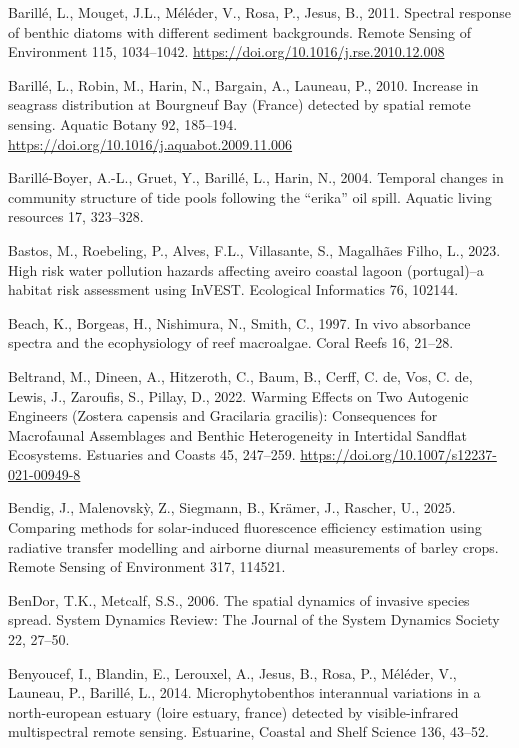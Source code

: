 \documentclass[
  letterpaper,
  11pt,
  english,
  singlespacing,
  headsepline]{MastersDoctoralThesis}
\newlength{\cslhangindent}
\newenvironment{CSLReferences}[2] %
 {\begin{list}{}{%
  \setlength{\itemindent}{0pt}
  \setlength{\leftmargin}{0pt}
  \setlength{\parsep}{0pt}
  \ifodd #1
   \setlength{\leftmargin}{\cslhangindent}
   \setlength{\itemindent}{-1\cslhangindent}
  \fi
  \setlength{\itemsep}{#2\baselineskip}}}
 {\end{list}}
\begin{document}
\begin{CSLReferences}{1}{0}
Barillé, L., Mouget, J.L., Méléder, V., Rosa, P., Jesus, B., 2011.
{Spectral response of benthic diatoms with different sediment
backgrounds}. Remote Sensing of Environment 115, 1034--1042.
\url{https://doi.org/10.1016/j.rse.2010.12.008}

Barillé, L., Robin, M., Harin, N., Bargain, A., Launeau, P., 2010.
{Increase in seagrass distribution at Bourgneuf Bay (France) detected by
spatial remote sensing}. Aquatic Botany 92, 185--194.
\url{https://doi.org/10.1016/j.aquabot.2009.11.006}

Barillé-Boyer, A.-L., Gruet, Y., Barillé, L., Harin, N., 2004. Temporal
changes in community structure of tide pools following the {``erika''}
oil spill. Aquatic living resources 17, 323--328.

Bastos, M., Roebeling, P., Alves, F.L., Villasante, S., Magalhães Filho,
L., 2023. High risk water pollution hazards affecting aveiro coastal
lagoon (portugal)--a habitat risk assessment using InVEST. Ecological
Informatics 76, 102144.

Beach, K., Borgeas, H., Nishimura, N., Smith, C., 1997. In vivo
absorbance spectra and the ecophysiology of reef macroalgae. Coral Reefs
16, 21--28.

Beltrand, M., Dineen, A., Hitzeroth, C., Baum, B., Cerff, C. de, Vos, C.
de, Lewis, J., Zaroufis, S., Pillay, D., 2022. {Warming Effects on Two
Autogenic Engineers (Zostera capensis and Gracilaria gracilis):
Consequences for Macrofaunal Assemblages and Benthic Heterogeneity in
Intertidal Sandflat Ecosystems}. Estuaries and Coasts 45, 247--259.
\url{https://doi.org/10.1007/s12237-021-00949-8}

Bendig, J., Malenovskỳ, Z., Siegmann, B., Krämer, J., Rascher, U., 2025.
Comparing methods for solar-induced fluorescence efficiency estimation
using radiative transfer modelling and airborne diurnal measurements of
barley crops. Remote Sensing of Environment 317, 114521.

BenDor, T.K., Metcalf, S.S., 2006. The spatial dynamics of invasive
species spread. System Dynamics Review: The Journal of the System
Dynamics Society 22, 27--50.

Benyoucef, I., Blandin, E., Lerouxel, A., Jesus, B., Rosa, P., Méléder,
V., Launeau, P., Barillé, L., 2014. Microphytobenthos interannual
variations in a north-european estuary (loire estuary, france) detected
by visible-infrared multispectral remote sensing. Estuarine, Coastal and
Shelf Science 136, 43--52.


\end{CSLReferences}
\end{document}
